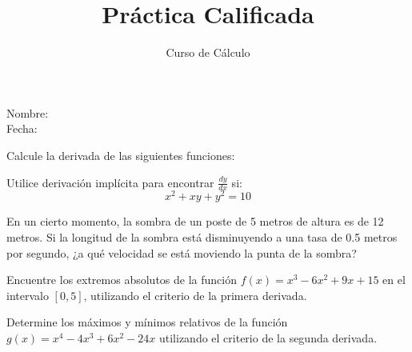 \documentclass[a4paper,12pt]{exam}
\title{Práctica Calificada}
\author{Curso de Cálculo}
\date{}
\begin{document}
\maketitle

\begin{center}
    Nombre: \underline{\hspace{8cm}} \\
    Fecha: \underline{\hspace{8cm}}
\end{center}

\vspace{0.5cm}

\begin{questions}

    \question[10] Calcule la derivada de las siguientes funciones:
    \vspace{2cm}

    \question[10] Utilice derivación implícita para encontrar \(\frac{dy}{dx}\) si:
    \[
        x^2 + xy + y^2 = 10
    \]
    \vspace{2cm}

    \question[10] En un cierto momento, la sombra de un poste de 5 metros de altura es de 12 metros. Si la longitud de la sombra está disminuyendo a una tasa de 0.5 metros por segundo, ¿a qué velocidad se está moviendo la punta de la sombra?
    \vspace{3cm}

    \question[10] Encuentre los extremos absolutos de la función \( f(x) = x^3 - 6x^2 + 9x + 15 \) en el intervalo \( [0, 5] \), utilizando el criterio de la primera derivada.
    \vspace{3cm}

    \question[10] Determine los máximos y mínimos relativos de la función \( g(x) = x^4 - 4x^3 + 6x^2 - 24x \) utilizando el criterio de la segunda derivada.
    \vspace{3cm}

\end{questions}
\end{document}
